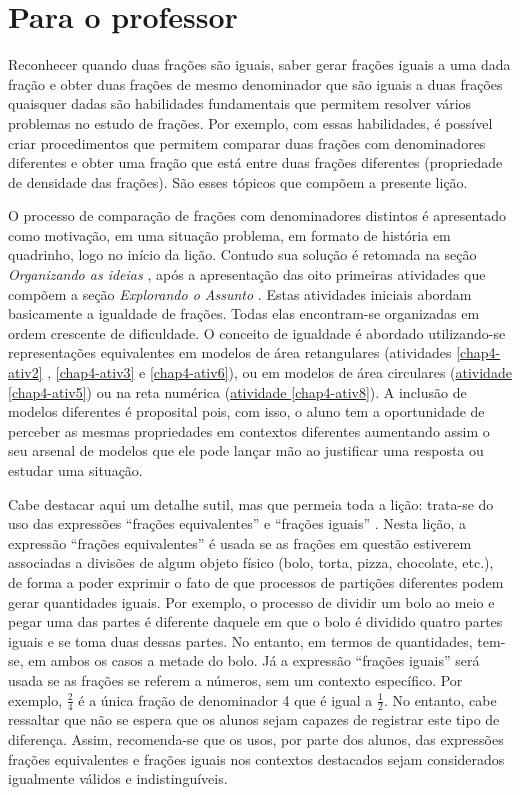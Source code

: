 
\chapter{Para o professor}\label{chap4}
Reconhecer quando duas frações são iguais, saber gerar frações iguais a uma
dada fração e obter duas frações de mesmo denominador que são iguais a duas
frações quaisquer dadas são habilidades fundamentais que permitem resolver
vários problemas no estudo de frações.  Por exemplo, com essas habilidades, é
possível criar procedimentos que permitem comparar duas frações com
denominadores diferentes e obter uma fração que está entre duas frações
diferentes (propriedade de densidade das frações). São esses tópicos que compõem
a presente lição.

  O processo de comparação de frações com denominadores distintos é apresentado
como motivação, em uma situação problema, em formato de história em quadrinho,
logo no início da lição. Contudo sua solução é retomada na seção   {\itshape Organizando as ideias}  , após a apresentação das oito primeiras atividades que
compõem a seção   {\itshape Explorando o Assunto}  . Estas atividades iniciais
abordam basicamente a igualdade de frações. Todas elas encontram-se organizadas
em ordem crescente de dificuldade. O conceito de igualdade é abordado
utilizando-se representações equivalentes em modelos de área retangulares
(atividades \ref{chap4-ativ2}  , \ref{chap4-ativ3}   e \ref{chap4-ativ6}), ou em modelos de área circulares (\hyperref[chap4-ativ5]{atividade \ref{chap4-ativ5}}) ou na
reta numérica (\hyperref[chap4-ativ5]{atividade \ref{chap4-ativ8}}). A inclusão de modelos diferentes é proposital pois,
com isso, o aluno tem a oportunidade de perceber as mesmas propriedades em
contextos diferentes aumentando assim o seu arsenal de modelos que ele pode
lançar mão ao justificar uma resposta ou estudar uma situação.

  Cabe destacar aqui um detalhe sutil, mas que permeia toda a lição: trata-se do
uso das expressões   ``frações equivalentes''   e   ``frações iguais''  . Nesta
lição, a expressão   ``frações equivalentes''   é usada se as frações em questão
estiverem associadas a divisões de algum objeto físico (bolo, torta, pizza,
chocolate, etc.), de forma a poder exprimir o fato de que processos de partições
diferentes podem gerar quantidades iguais. Por exemplo, o processo de dividir um
bolo ao meio e pegar uma das partes é diferente daquele em que o bolo é dividido
quatro partes iguais e se toma duas dessas partes. No entanto, em termos de
quantidades, tem-se, em ambos os casos a metade do bolo. Já a expressão
``frações iguais''   será usada se as frações se referem a números, sem um
contexto específico. Por exemplo,   $\frac{2}{4}$   é a única fração de
denominador 4 que é igual a   $\frac{1}{2}$. No entanto, cabe ressaltar que não
se espera que os alunos sejam capazes de registrar este tipo de diferença.
Assim, recomenda-se que os usos, por parte dos alunos, das expressões frações
equivalentes e frações iguais nos contextos destacados sejam considerados
igualmente válidos e indistinguíveis.

